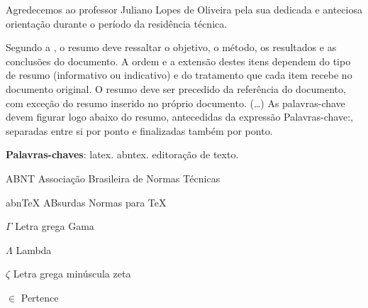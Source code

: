 \documentclass[
	12pt,				%
	openright,			%
	twoside,			%
	a4paper,			%
	english,			%
	french,				%
	spanish,			%
	brazil,				%
	]{abntex2}
\begin{document}
\begin{agradecimentos}
Agredecemos ao professor Juliano Lopes de Oliveira pela sua dedicada e anteciosa orientação durante o período da residência técnica. 


\end{agradecimentos}


\setlength{\absparsep}{18pt} %
\begin{resumo}
 Segundo a , o resumo deve ressaltar o
 objetivo, o método, os resultados e as conclusões do documento. A ordem e a extensão
 destes itens dependem do tipo de resumo (informativo ou indicativo) e do
 tratamento que cada item recebe no documento original. O resumo deve ser
 precedido da referência do documento, com exceção do resumo inserido no
 próprio documento. (\ldots) As palavras-chave devem figurar logo abaixo do
 resumo, antecedidas da expressão Palavras-chave:, separadas entre si por
 ponto e finalizadas também por ponto.

 \noindent
 \textbf{Palavras-chaves}: latex. abntex. editoração de texto.
\end{resumo}

\listoffigures*
\cleardoublepage

\listoftables*
\cleardoublepage

\begin{siglas}
  \item[ABNT] Associação Brasileira de Normas Técnicas
  \item[abnTeX] ABsurdas Normas para TeX
\end{siglas}

\begin{simbolos}
  \item[$ \Gamma $] Letra grega Gama
  \item[$ \Lambda $] Lambda
  \item[$ \zeta $] Letra grega minúscula zeta
  \item[$ \in $] Pertence
\end{simbolos}

\tableofcontents*
\cleardoublepage
\end{document}
